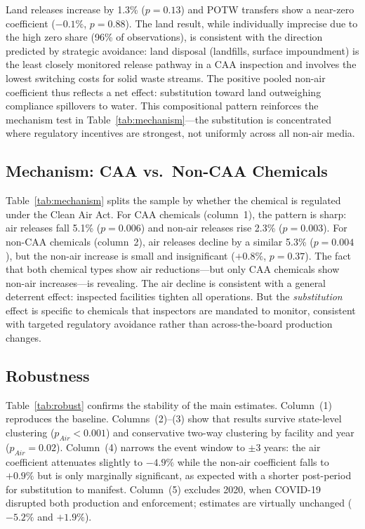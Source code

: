 \documentclass[12pt]{article}
\begin{document}
Land releases increase by 1.3\% ($p = 0.13$) and POTW transfers show a near-zero coefficient ($-0.1\%$, $p = 0.88$). The land result, while individually imprecise due to the high zero share (96\% of observations), is consistent with the direction predicted by strategic avoidance: land disposal (landfills, surface impoundment) is the least closely monitored release pathway in a CAA inspection and involves the lowest switching costs for solid waste streams. The positive pooled non-air coefficient thus reflects a net effect: substitution toward land outweighing compliance spillovers to water. This compositional pattern reinforces the mechanism test in Table~\ref{tab:mechanism}---the substitution is concentrated where regulatory incentives are strongest, not uniformly across all non-air media.

\subsection{Mechanism: CAA vs.\ Non-CAA Chemicals}



Table~\ref{tab:mechanism} splits the sample by whether the chemical is regulated under the Clean Air Act. For CAA chemicals (column~1), the pattern is sharp: air releases fall 5.1\% ($p = 0.006$) and non-air releases rise 2.3\% ($p = 0.003$). For non-CAA chemicals (column~2), air releases decline by a similar 5.3\% ($p = 0.004$), but the non-air increase is small and insignificant ($+0.8\%$, $p = 0.37$). The fact that both chemical types show air reductions---but only CAA chemicals show non-air increases---is revealing. The air decline is consistent with a general deterrent effect: inspected facilities tighten all operations. But the \textit{substitution} effect is specific to chemicals that inspectors are mandated to monitor, consistent with targeted regulatory avoidance rather than across-the-board production changes.

\subsection{Robustness}



Table~\ref{tab:robust} confirms the stability of the main estimates. Column~(1) reproduces the baseline. Columns~(2)--(3) show that results survive state-level clustering ($p_{Air} < 0.001$) and conservative two-way clustering by facility and year ($p_{Air} = 0.02$). Column~(4) narrows the event window to $\pm 3$ years: the air coefficient attenuates slightly to $-4.9\%$ while the non-air coefficient falls to $+0.9\%$ but is only marginally significant, as expected with a shorter post-period for substitution to manifest. Column~(5) excludes 2020, when COVID-19 disrupted both production and enforcement; estimates are virtually unchanged ($-5.2\%$ and $+1.9\%$).
\end{document}
